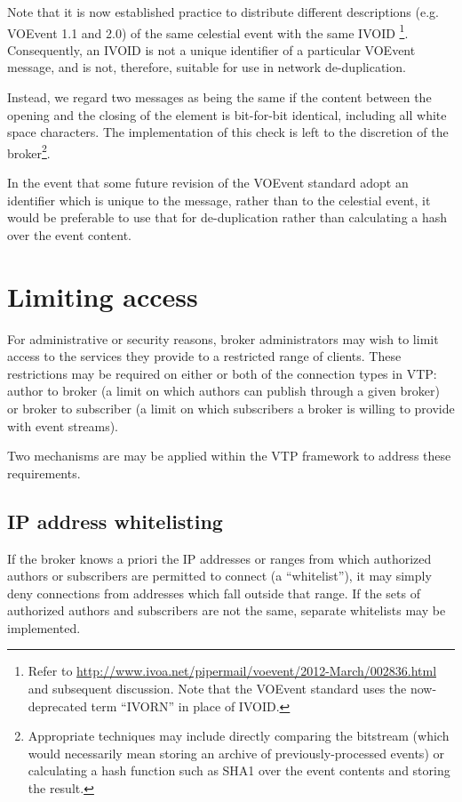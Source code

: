 \documentclass[a4paper,11pt]{ivoa}
\begin{document}
Note that it is now established practice to distribute different descriptions
(e.g. VOEvent 1.1 and 2.0) of the same celestial event with the same IVOID
\footnote{Refer to
\url{http://www.ivoa.net/pipermail/voevent/2012-March/002836.html} and
subsequent discussion. Note that the VOEvent standard uses the now-deprecated
term “IVORN” in place of IVOID.}. Consequently, an IVOID is not a unique
identifier of a particular VOEvent message, and is not, therefore, suitable
for use in network de-duplication.

Instead, we regard two messages as being the same if the content between the
opening \xmlel{<} and the closing \xmlel{>} of the 
element is bit-for-bit identical, including all white space characters. The
implementation of this check is left to the discretion of the broker\footnote{
Appropriate techniques may include directly comparing the bitstream (which
would necessarily mean storing an archive of previously-processed events) or
calculating a hash function such as SHA1 \citep{Eastlake:2001} over the event
contents and storing the result.}.

In the event that some future revision of the VOEvent standard adopt an
identifier which is unique to the message, rather than to the celestial event,
it would be preferable to use that for de-duplication rather than calculating
a hash over the event content.

\section{Limiting access}
\label{sec:limit}

For administrative or security reasons, broker administrators may wish to
limit access to the services they provide to a restricted range of clients.
These restrictions may be required on either or both of the connection types
in VTP: author to broker (a limit on which authors can publish through a given
broker) or broker to subscriber (a limit on which subscribers a broker is
willing to provide with event streams).

Two mechanisms are may be applied within the VTP framework to address these
requirements.

\subsection{IP address whitelisting}
\label{sec:limit:whitelist}

If the broker knows a priori the IP addresses or ranges from which authorized
authors or subscribers are permitted to connect (a ``whitelist''), it may
simply deny connections from addresses which fall outside that range. If the
sets of authorized authors and subscribers are not the same, separate
whitelists may be implemented.
\end{document}

